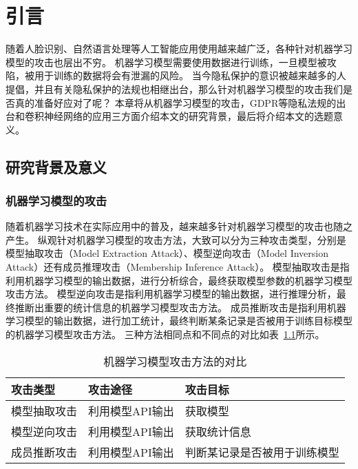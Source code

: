 
\chapter{引言}

随着人脸识别、自然语言处理等人工智能应用使用越来越广泛，各种针对机器学习模型的攻击也层出不穷。
机器学习模型需要使用数据进行训练，一旦模型被攻陷，被用于训练的数据将会有泄漏的风险。
当今隐私保护的意识被越来越多的人提倡，并且有关隐私保护的法规也相继出台，那么针对机器学习模型的攻击我们是否真的准备好应对了呢？
本章将从机器学习模型的攻击，GDPR等隐私法规的出台和卷积神经网络的应用三方面介绍本文的研究背景，最后将介绍本文的选题意义。

\section{研究背景及意义}

\subsection{机器学习模型的攻击}
随着机器学习技术在实际应用中的普及，越来越多针对机器学习模型的攻击也随之产生。
纵观针对机器学习模型的攻击方法，大致可以分为三种攻击类型，分别是模型抽取攻击（Model Extraction Attack）、模型逆向攻击（Model Inversion Attack）还有成员推理攻击（Membership Inference Attack）。
模型抽取攻击是指利用机器学习模型的输出数据，进行分析综合，最终获取模型参数的机器学习模型攻击方法。
模型逆向攻击是指利用机器学习模型的输出数据，进行推理分析，最终推断出重要的统计信息的机器学习模型攻击方法。
成员推断攻击是指利用机器学习模型的输出数据，进行加工统计，最终判断某条记录是否被用于训练目标模型的机器学习模型攻击方法。
三种方法相同点和不同点的对比如表~\ref{tab:model-attack-difference}所示。
\begin{table}
    \centering
    \caption{机器学习模型攻击方法的对比}
    \begin{tabular}{lll}
      \toprule
      攻击类型  & 攻击途径 & 攻击目标  \\
      \midrule
      模型抽取攻击   & 利用模型API输出 & 获取模型 \\
      模型逆向攻击   & 利用模型API输出 & 获取统计信息                    \\
      成员推断攻击 & 利用模型API输出  & 判断某记录是否被用于训练模型  \\
      \bottomrule
    \end{tabular}
    \label{tab:model-attack-difference}
\end{table}

